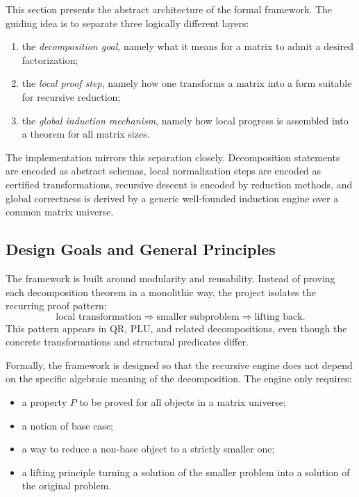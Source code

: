 \documentclass[pdflatex,sn-mathphys-num]{sn-jnl}%
\theoremstyle{thmstyleone}%
\theoremstyle{thmstyletwo}%
\theoremstyle{thmstylethree}%
\begin{document}
This section presents the abstract architecture of the formal framework.  The guiding idea is to separate three logically different layers:

\begin{enumerate}
\item the \emph{decomposition goal}, namely what it means for a matrix to admit a desired factorization;
\item the \emph{local proof step}, namely how one transforms a matrix into a form suitable for recursive reduction;
\item the \emph{global induction mechanism}, namely how local progress is assembled into a theorem for all matrix sizes.
\end{enumerate}

The implementation mirrors this separation closely.  Decomposition statements are encoded as abstract schemas, local normalization steps are encoded as certified transformations, recursive descent is encoded by reduction methods, and global correctness is derived by a generic well-founded induction engine over a common matrix universe.

\subsection{Design Goals and General Principles}

The framework is built around modularity and reusability.  Instead of proving each decomposition theorem in a monolithic way, the project isolates the recurring proof pattern:
\[
\text{local transformation} \Longrightarrow \text{smaller subproblem} \Longrightarrow \text{lifting back}.
\]
This pattern appears in QR, PLU, and related decompositions, even though the concrete transformations and structural predicates differ.

Formally, the framework is designed so that the recursive engine does not depend on the specific algebraic meaning of the decomposition.  The engine only requires:

\begin{itemize}
\item a property \(P\) to be proved for all objects in a matrix universe;
\item a notion of base case;
\item a way to reduce a non-base object to a strictly smaller one;
\item a lifting principle turning a solution of the smaller problem into a solution of the original problem.
\end{itemize}
\end{document}
